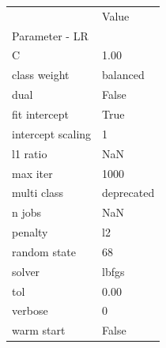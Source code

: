 \begin{tabular}{ll}
\toprule
 & Value \\
Parameter - LR &  \\
\midrule
C & 1.00 \\
class weight & balanced \\
dual & False \\
fit intercept & True \\
intercept scaling & 1 \\
l1 ratio & NaN \\
max iter & 1000 \\
multi class & deprecated \\
n jobs & NaN \\
penalty & l2 \\
random state & 68 \\
solver & lbfgs \\
tol & 0.00 \\
verbose & 0 \\
warm start & False \\
\bottomrule
\end{tabular}
